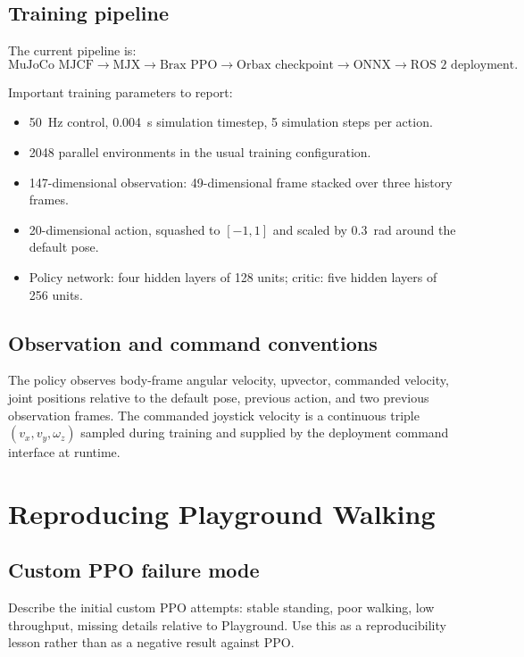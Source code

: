 \subsection{Training pipeline}

The current pipeline is:
\[
\text{MuJoCo MJCF} \rightarrow \text{MJX} \rightarrow \text{Brax PPO} \rightarrow \text{Orbax checkpoint} \rightarrow \text{ONNX} \rightarrow \text{ROS 2 deployment}.
\]

Important training parameters to report:
\begin{itemize}
  \item 50~Hz control, 0.004~s simulation timestep, 5 simulation steps per action.
  \item 2048 parallel environments in the usual training configuration.
  \item 147-dimensional observation: 49-dimensional frame stacked over three history frames.
  \item 20-dimensional action, squashed to $[-1,1]$ and scaled by 0.3~rad around the default pose.
  \item Policy network: four hidden layers of 128 units; critic: five hidden layers of 256 units.
\end{itemize}

\subsection{Observation and command conventions}

The policy observes body-frame angular velocity, upvector, commanded velocity, joint positions relative to the default pose, previous action, and two previous observation frames. The commanded joystick velocity is a continuous triple $(v_x, v_y, \omega_z)$ sampled during training and supplied by the deployment command interface at runtime.

\section{Reproducing Playground Walking}
\label{sec:reproduction}

\subsection{Custom PPO failure mode}

Describe the initial custom PPO attempts: stable standing, poor walking, low throughput, missing details relative to Playground. Use this as a reproducibility lesson rather than as a negative result against PPO.

